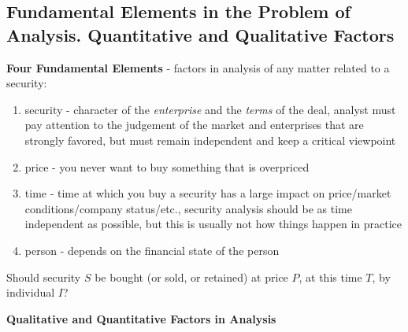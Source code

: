 \documentclass{article}
\begin{document}
\subsection{Fundamental Elements in the Problem of Analysis. Quantitative and Qualitative Factors}
\textbf{Four Fundamental Elements} - factors in analysis of any matter related to a security:
\begin{enumerate}
\item security - character of the \textit{enterprise} and the \textit{terms} of the deal, analyst must pay attention to the judgement of the market and enterprises that are strongly favored, but must remain independent and keep a critical viewpoint
\item price - you never want to buy something that is overpriced
\item time - time at which you buy a security has a large impact on price/market conditions/company status/etc., security analysis should be as time independent as possible, but this is usually not how things happen in practice
\item person - depends on the financial state of the person
\end{enumerate}
Should security $S$ be bought (or sold, or retained) at price $P$, at this time $T$, by individual $I$?
\par
\textbf{Qualitative and Quantitative Factors in Analysis}
\end{document}
